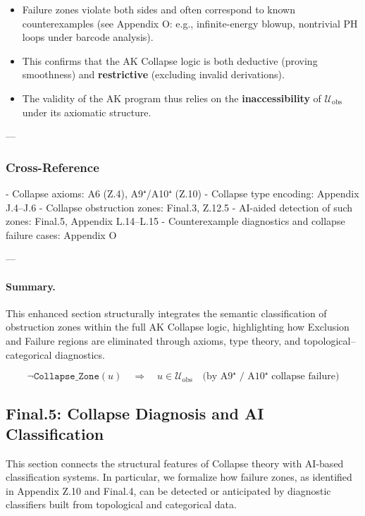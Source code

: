 \documentclass[11pt]{article}
\begin{document}
\begin{axiom}
\begin{axiom}
{{\begin{itemize}
  \item Failure zones violate both sides and often correspond to known counterexamples  
  (see Appendix O: e.g., infinite-energy blowup, nontrivial PH loops under barcode analysis).

  \item This confirms that the AK Collapse logic is both deductive (proving smoothness)  
  and \textbf{restrictive} (excluding invalid derivations).

  \item The validity of the AK program thus relies on the \textbf{inaccessibility}  
  of \( \mathcal{U}_{\mathrm{obs}} \) under its axiomatic structure.
\end{itemize}

---

\subsubsection*{Cross-Reference}

- Collapse axioms: A6 (Z.4), A9⁺/A10⁺ (Z.10)
- Collapse type encoding: Appendix J.4–J.6
- Collapse obstruction zones: Final.3, Z.12.5
- AI-aided detection of such zones: Final.5, Appendix L.14–L.15  
- Counterexample diagnostics and collapse failure cases: Appendix O

---

\paragraph{Summary.}
This enhanced section structurally integrates the semantic classification of obstruction zones  
within the full AK Collapse logic, highlighting how Exclusion and Failure regions  
are eliminated through axioms, type theory, and topological–categorical diagnostics.

\[
\boxed{
\neg \texttt{Collapse\_Zone}(u) \quad \Rightarrow \quad u \in \mathcal{U}_{\mathrm{obs}} \quad \text{(by A9⁺ / A10⁺ collapse failure)}
}
\]




\subsection*{Final.5: Collapse Diagnosis and AI Classification}

This section connects the structural features of Collapse theory with AI-based classification systems.  
In particular, we formalize how failure zones, as identified in Appendix Z.10 and Final.4,  
can be detected or anticipated by diagnostic classifiers built from topological and categorical data.

}}
\end{axiom}
\end{axiom}
\end{document}
